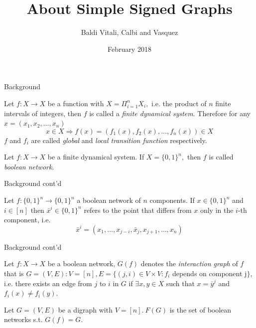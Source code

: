 \documentclass{beamer}
\title{About Simple Signed Graphs}
\author{Baldi Vitali, Calbi and Vasquez}
\institute{Université Nice Sophia-Antipolis}
\date{February 2018}
\begin{document}
	
\frame{\titlepage}

\begin{frame}{Background}
    \begin{definition}
    \justifying
        Let $f:X \to X$ be a function with $X=\Pi_{i=1}^n X_i,$ i.e. the product of $n$ finite intervals of integers, then $f$ is called a \textit{finite dynamical system}. Therefore for any $x = (x_1, x_2, \dots, x_n)$
        \[
        x \in X \Rightarrow f(x) = (f_1(x), f_2(x), \dots, f_n(x)) \in X
        \]
        $f$ and $f_i$ are called \textit{global} and \textit{local transition function} respectively.
    \end{definition}
    
    \begin{definition}
    \justifying
        Let $f:X \to X$ be a finite dynamical system. If $X=\{0,1\}^n,$ then $f$ is called \textit{boolean network}.
    \end{definition}
\end{frame}

\begin{frame}{Background cont'd}
\justifying
    \begin{definition}[$\bar{x}^i$]
    	Let $f:\{0,1\}^n \rightarrow \{0,1\}^n$ a boolean network of $n$ components. If $x \in \{0,1\}^n$ and $i \in [n]$ then $\bar{x}^i \in \{0,1\}^n$ refers to the point that differs from $x$ only in the $i$-th component, i.e.
    	\[
    	\bar{x}^i = (x_1, \dots, x_{j-i}, \bar{x}_j, x_{j+1}, \dots, x_n)
    	\]
    \end{definition}
\end{frame}

\begin{frame}{Background cont'd}
\justifying
    \begin{definition}
        Let $f : X \to X$ be a boolean network, $G(f)$ denotes the \textit{interaction graph} of $f$ that is $G=(V,E) : V = [n], E = \{ (j,i) \in V \times V : f_i$ depends on component j$\}$, i.e. there exists an edge from $j$ to $i$ in $G$ if $\exists x,y \in X$ such that $x = \bar{y}^j$ and $f_i(x) \neq f_i(y)$.
    \end{definition}
    \begin{definition}[F(G)]
        Let $G=(V,E)$ be a digraph with $V=[n].\ F(G)$ is the set of boolean networks s.t. $G(f)=G.$
    \end{definition}
\end{frame}
\end{document}

